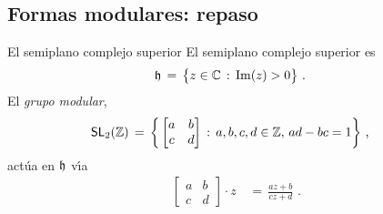 \theoremstyle{remark}
\newtheorem{teoMultUno}{Teorema}[section]
\newtheorem{teoPrincipioKoecher}[teoMultUno]{Teorema}
\newtheorem{defFormaEliptica}{Definici\'{o}n}[section]
\newtheorem{obsSimplificacionCuadraticoReal}[teoMultUno]%
	{Simplificaci\'{o}n}
\newtheorem{obsSubgruposCongruencia}[teoMultUno]{Observaciones}
\newtheorem{defFormaHilbertClasica}[teoMultUno]{Definici\'{o}n}
\newtheorem{obsDesarrolloDeFou}[teoMultUno]{Observaci\'{o}n}
\newtheorem{defNotacion}[teoMultUno]{Definici\'{o}n}
%
\newtheorem{defFormasNuevas}[teoMultUno]{Definici\'{o}n}
\newtheorem{coroBaseFormasNuevas}[teoMultUno]{Corolario}


\subsection{Formas modulares: repaso}

\begin{frame}{El semiplano complejo superior}
	El semiplano complejo superior es
	\begin{align*}
		\mathfrak{h} & \,=\,\big\{z\in\mathbb{C}\,:\,\mathrm{Im}(z)>0\big\}
		\text{ .}
	\end{align*}
	El \emph{grupo modular},
	\begin{align*}
		\SL[2](\bb{Z}) & \,=\,\bigg\{
			\begin{bmatrix} a & b \\ c & d \end{bmatrix} \,:\,
			a,b,c,d\in\bb{Z},\,ad-bc=1\bigg\}%
		\text{ ,}
	\end{align*}
	act\'{u}a en $\mathfrak{h}$ v\'{\i}a
	\begin{align*}
		\begin{bmatrix} a & b \\ c & d \end{bmatrix}\cdot z & \,=\,
			\frac{az+b}{cz+d}
		\text{ .}
	\end{align*}
\end{frame}

